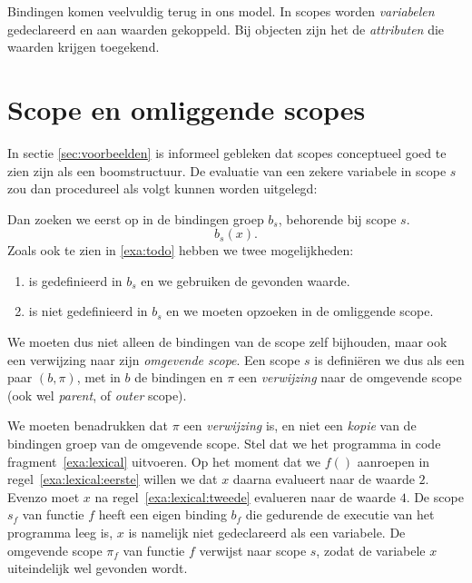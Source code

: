 Bindingen komen veelvuldig terug in ons model. In scopes worden \emph{variabelen} gedeclareerd en aan waarden gekoppeld. Bij objecten zijn het de \emph{attributen} die waarden krijgen toegekend.

\section{Scope en omliggende scopes}

In sectie \ref{sec:voorbeelden} is informeel gebleken dat scopes conceptueel goed te zien zijn als een boomstructuur. De evaluatie van een zekere variabele  in scope $s$ zou dan procedureel als volgt kunnen worden uitgelegd:

\newCodeFragment
{}

Dan zoeken we  eerst op in de bindingen groep $b_s$, behorende bij scope $s$.
$$
  b_s(x).
$$
Zoals ook te zien in \ref{exa:todo} hebben we twee mogelijkheden:

\begin{enumerate}
  \item {} is gedefinieerd in $b_s$ en we gebruiken de gevonden waarde.
  \item {} is niet gedefinieerd in $b_s$ en we moeten  opzoeken in de omliggende scope.
\end{enumerate}

We moeten dus niet alleen de bindingen van de scope zelf bijhouden, maar ook een verwijzing naar zijn \emph{omgevende scope}. Een scope $s$ is definiëren we dus als een paar $(b,\pi)$, met in $b$ de bindingen en $\pi$ een \emph{verwijzing} naar de omgevende scope (ook wel \emph{parent}, of \emph{outer} scope).

We moeten benadrukken dat $\pi$ een \emph{verwijzing} is, en niet een \emph{kopie} van de bindingen groep van de omgevende scope. Stel dat we het programma in code fragment~\ref{exa:lexical} uitvoeren. Op het moment dat we $f()$ aanroepen in regel~\ref{exa:lexical:eerste} willen we dat $x$ daarna evalueert naar de waarde $2$. Evenzo moet $x$ na regel~\ref{exa:lexical:tweede} evalueren naar de waarde $4$. De scope $s_f$ van functie $f$ heeft een eigen binding $b_f$ die gedurende de executie van het programma leeg is, $x$ is namelijk niet gedeclareerd als een \LOCAL variabele. De omgevende scope $\pi_f$ van functie $f$ verwijst naar scope $s$, zodat de variabele $x$ uiteindelijk wel gevonden wordt.

